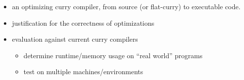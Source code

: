 
\begin{itemize}
  \item an optimizing curry compiler, from source (or flat-curry) to executable code.
  \item justification for the correctness of optimizations
  \item evaluation against current curry compilers
  \begin{itemize}
    \item determine runtime/memory usage on ``real world'' programs
    \item test on multiple machines/environments
  \end{itemize}
\end{itemize}
